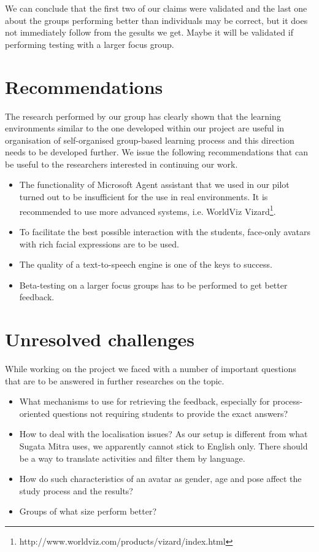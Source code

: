 \documentclass[a4paper]{article}
\begin{document}
We can conclude that the first two of our claims were validated and the last one about the groups performing better than individuals may be correct, but it does not immediately follow from the gesults we get. Maybe it will be validated if performing testing with a larger focus group.

\section{Recommendations}

The research performed by our group has clearly shown that the learning environments similar to the one developed within our project are useful in organisation of self-organised group-based learning process and this direction needs to be developed further. We issue the following recommendations that can be useful to the researchers interested in continuing our work.

\begin{itemize}
	\item The functionality of Microsoft Agent assistant that we used in our pilot turned out to be insufficient for the use in real environments. It is recommended to use more advanced systems, i.e. WorldViz Vizard\footnote{http://www.worldviz.com/products/vizard/index.html}.
	\item To facilitate the best possible interaction with the students, face-only avatars with rich facial expressions are to be used.
	\item The quality of a text-to-speech engine is one of the keys to success.
	\item Beta-testing on a larger focus groups has to be performed to get better feedback.  
\end{itemize}

\section{Unresolved challenges}

While working on the project we faced with a number of important questions that are to be answered in further researches on the topic.

\begin{itemize}
	\item What mechanisms to use for retrieving the feedback, especially for process-oriented questions not requiring students to provide the exact answers?
	\item How to deal with the localisation issues? As our setup is different from what Sugata Mitra uses, we apparently cannot stick to English only. There should be a way to translate activities and filter them by language.
	\item How do such characteristics of an avatar as gender, age and pose affect the study process and the results?
	\item Groups of what size perform better?
\end{itemize}
\end{document}
